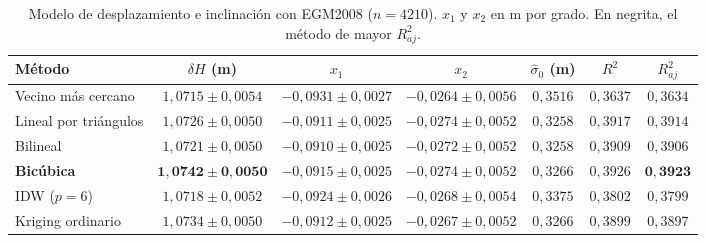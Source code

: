 \documentclass[11pt,letterpaper]{article}
\begin{document}
\begin{table}[H]
\centering
\caption{Modelo de desplazamiento e inclinación con EGM2008 ($n=4210$). $x_1$ y $x_2$ en m
por grado. En negrita, el método de mayor $R^2_{aj}$.}
\label{tab:param_egm}
\small
\begin{adjustbox}{max width=\linewidth}
\begin{tabular}{@{}lcccccc@{}}
\toprule
Método & $\delta H$ (m) & $x_1$ & $x_2$ & $\hat\sigma_0$ (m) & $R^2$ & $R^2_{aj}$ \\
\midrule
Vecino más cercano    & $1{,}0715\pm0{,}0054$ & $-0{,}0931\pm0{,}0027$ & $-0{,}0264\pm0{,}0056$ & $0{,}3516$ & $0{,}3637$ & $0{,}3634$ \\
Lineal por triángulos & $1{,}0726\pm0{,}0050$ & $-0{,}0911\pm0{,}0025$ & $-0{,}0274\pm0{,}0052$ & $0{,}3258$ & $0{,}3917$ & $0{,}3914$ \\
Bilineal              & $1{,}0721\pm0{,}0050$ & $-0{,}0910\pm0{,}0025$ & $-0{,}0272\pm0{,}0052$ & $0{,}3258$ & $0{,}3909$ & $0{,}3906$ \\
\textbf{Bicúbica}     & $\mathbf{1{,}0742\pm0{,}0050}$ & $-0{,}0915\pm0{,}0025$ & $-0{,}0274\pm0{,}0052$ & $0{,}3266$ & $0{,}3926$ & $\mathbf{0{,}3923}$ \\
IDW ($p=6$)           & $1{,}0718\pm0{,}0052$ & $-0{,}0924\pm0{,}0026$ & $-0{,}0268\pm0{,}0054$ & $0{,}3375$ & $0{,}3802$ & $0{,}3799$ \\
Kriging ordinario     & $1{,}0734\pm0{,}0050$ & $-0{,}0912\pm0{,}0025$ & $-0{,}0267\pm0{,}0052$ & $0{,}3266$ & $0{,}3899$ & $0{,}3897$ \\
\bottomrule
\end{tabular}
\end{adjustbox}
\end{table}
\end{document}

